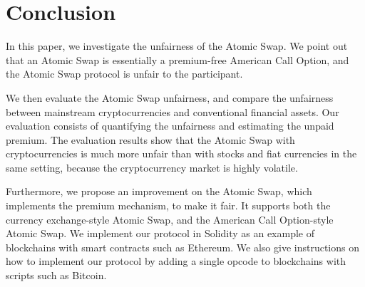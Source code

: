 \section{Conclusion}
\label{sec:conclusion}


In this paper, we investigate the unfairness of the Atomic Swap.
We point out that an Atomic Swap is essentially a premium-free American Call Option,
and the Atomic Swap protocol is unfair to the participant.

We then evaluate the Atomic Swap unfairness, and compare the unfairness between mainstream cryptocurrencies and conventional financial assets.
Our evaluation consists of quantifying the unfairness and estimating the unpaid premium.
The evaluation results show that the Atomic Swap with cryptocurrencies is much more unfair than with stocks and fiat currencies in the same setting, because the cryptocurrency market is highly volatile.

Furthermore, we propose an improvement on the Atomic Swap, which implements the premium mechanism, to make it fair.
It supports both the currency exchange-style Atomic Swap, and the American Call Option-style Atomic Swap.
We implement our protocol in Solidity as an example of blockchains with smart contracts such as Ethereum.
We also give instructions on how to implement our protocol by adding a single opcode to blockchains with scripts such as Bitcoin.